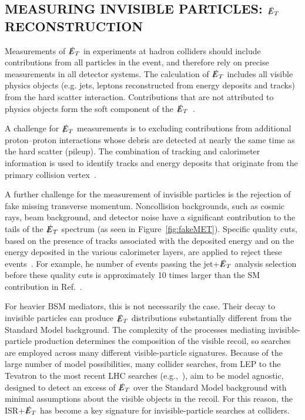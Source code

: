 \documentclass{ar-1col}
\newcommand{\IP}{invisible particle}
\newcommand{\MET}{\ensuremath{\slashed{E}_T}\xspace}
\begin{document}
\begin{textbox}
\section{MEASURING INVISIBLE PARTICLES: \MET RECONSTRUCTION}

Measurements of \MET in experiments at hadron colliders 
should include contributions from all particles in the event, 
and therefore rely on precise measurements in all detector systems. 
The calculation of \MET includes all visible physics objects 
(e.g. jets, leptons reconstructed from energy deposits and tracks)
from  the hard scatter interaction. 
Contributions that are not attributed to physics objects form the
soft component of the \MET~\cite{Aad:2016nrq,CMS-PAS-JME-16-004}.

A challenge for \MET measurements is to excluding contributions from
additional proton--proton interactions whose
debris are detected at nearly the same time as the hard scatter (pileup). 
The combination of tracking and calorimeter information is used to identify
tracks and energy deposits that originate from the primary collision
vertex~\cite{CMS-PAS-JME-16-004,ATLAS-CONF-2014-019}. 

A further challenge for the measurement of invisible particles is
the rejection of fake missing transverse momentum. 
Noncollision backgrounds, such as cosmic rays, beam background, and detector
noise have a significant contribution to the tails of the \MET
spectrum (as seen in Figure~\ref{fig:fakeMET}). Specific quality
cuts, based on the presence of tracks associated with the deposited
energy and on the energy deposited in the various calorimeter layers,
are applied to reject these events~\cite{ATLAS-CONF-2015-029}. For example, he
number of events passing the jet+\MET analysis selection before
these quality cuts is approximately 10 times larger than the SM
contribution in Ref.~\cite{Aaboud:2016tnv}.
\end{textbox}

For heavier BSM mediators, this is not necessarily the case. Their
decay to {\IP}s can produce \MET distributions substantially
different from the Standard Model background. The complexity of the processes
mediating invisible-particle production determines the composition
of the visible recoil, so searches are employed across many
different visible-particle signatures. 
Because of the large number of model possibilities, many collider
searches, from LEP to the Tevatron to the most recent LHC searches
(e.g.,~), aim to be model agnostic,
designed to detect an excess of \MET over the Standard Model background with
minimal assumptions about the visible objects in the recoil.
For this reason, the ISR+\MET has become a key
signature for invisible-particle searches at colliders. 
\end{document}
